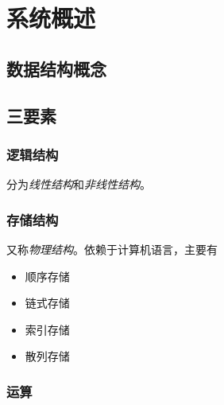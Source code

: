 
\chapter{系统概述}

\section{数据结构概念}


\section{三要素}


\subsection{逻辑结构}
分为\textit{线性结构}和\textit{非线性结构}。


\subsection{存储结构}
又称\textit{物理结构}。依赖于计算机语言，主要有\begin{itemize}
    \item 顺序存储
    \item 链式存储
    \item 索引存储
    \item 散列存储
\end{itemize}


\subsection{运算}


